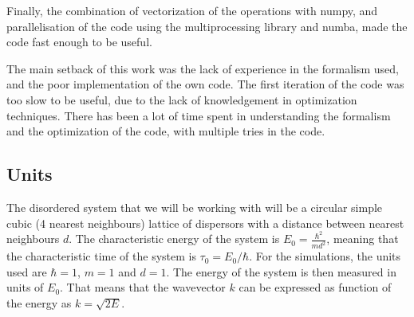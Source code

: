Finally, the combination of vectorization of the operations with numpy, and parallelisation of the code using the multiprocessing library and numba, made the code fast enough to be useful.

The main setback of this work was the lack of experience in the formalism used, and the poor implementation of the own code. The first iteration of the code was too slow to be useful, due to the lack of knowledgement in optimization techniques. There has been a lot of time spent in understanding the formalism and the optimization of the code, with multiple tries in the code. 

\subsection{Units}

The disordered system that we will be working with will be a circular simple cubic (4 nearest neighbours) lattice of dispersors with a distance between nearest neighbours $d$. The characteristic energy of the system is $E_0 = \frac{\hbar^2}{md^2}$, meaning that the characteristic time of the system is $\tau_0 = E_0/\hbar$. For the simulations, the units used are $\hbar=1$, $m=1$ and $d=1$. The energy of the system is then measured in units of $E_0$. That means that the wavevector $k$ can be expressed as function of the energy as $k = \sqrt{2E}$.